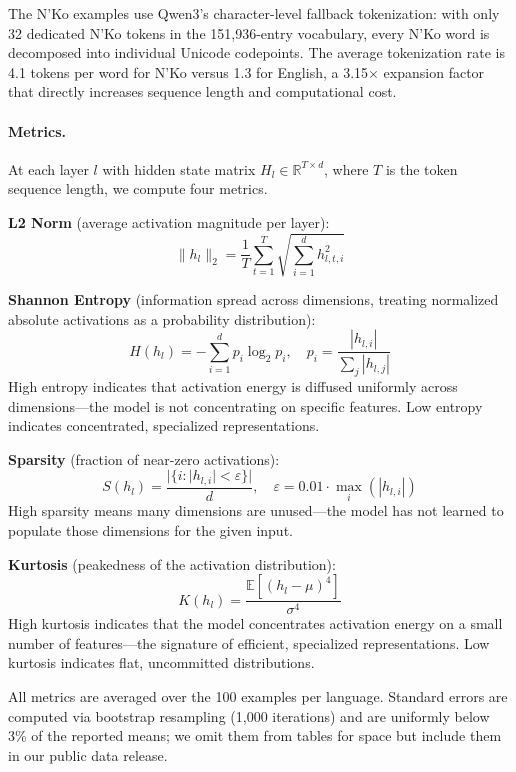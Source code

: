 \documentclass[11pt]{article}
\begin{document}
The N'Ko examples use Qwen3's character-level fallback tokenization: with only 32 dedicated N'Ko tokens in the 151,936-entry vocabulary, every N'Ko word is decomposed into individual Unicode codepoints.
The average tokenization rate is 4.1 tokens per word for N'Ko versus 1.3 for English, a 3.15$\times$ expansion factor that directly increases sequence length and computational cost.

\paragraph{Metrics.}
At each layer $l$ with hidden state matrix $H_l \in \mathbb{R}^{T \times d}$, where $T$ is the token sequence length, we compute four metrics.

\textbf{L2 Norm} (average activation magnitude per layer):
\begin{equation}
\|h_l\|_2 = \frac{1}{T} \sum_{t=1}^{T} \sqrt{\sum_{i=1}^{d} h_{l,t,i}^2}
\end{equation}

\textbf{Shannon Entropy} (information spread across dimensions, treating normalized absolute activations as a probability distribution):
\begin{equation}
H(h_l) = -\sum_{i=1}^{d} p_i \log_2 p_i, \quad p_i = \frac{|h_{l,i}|}{\sum_j |h_{l,j}|}
\end{equation}
High entropy indicates that activation energy is diffused uniformly across dimensions---the model is not concentrating on specific features.
Low entropy indicates concentrated, specialized representations.

\textbf{Sparsity} (fraction of near-zero activations):
\begin{equation}
S(h_l) = \frac{|\{i : |h_{l,i}| < \varepsilon\}|}{d}, \quad \varepsilon = 0.01 \cdot \max_i(|h_{l,i}|)
\end{equation}
High sparsity means many dimensions are unused---the model has not learned to populate those dimensions for the given input.

\textbf{Kurtosis} (peakedness of the activation distribution):
\begin{equation}
K(h_l) = \frac{\mathbb{E}\left[(h_l - \mu)^4\right]}{\sigma^4}
\end{equation}
High kurtosis indicates that the model concentrates activation energy on a small number of features---the signature of efficient, specialized representations.
Low kurtosis indicates flat, uncommitted distributions.

All metrics are averaged over the 100 examples per language.
Standard errors are computed via bootstrap resampling (1,000 iterations) and are uniformly below 3\% of the reported means; we omit them from tables for space but include them in our public data release.
\end{document}
